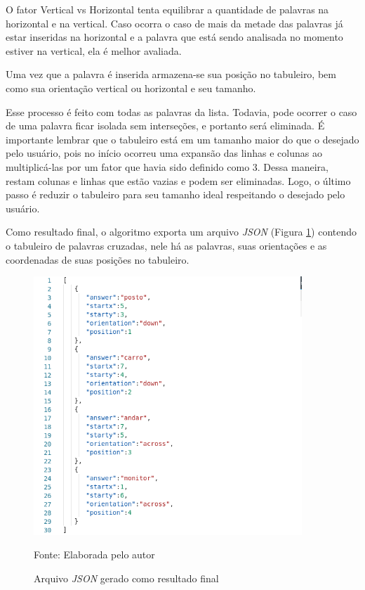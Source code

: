 O fator Vertical vs Horizontal tenta equilibrar a quantidade de palavras na horizontal e na vertical. Caso ocorra o caso de mais da metade das palavras já estar inseridas na horizontal e a palavra que está sendo analisada no momento estiver na vertical, ela é melhor avaliada.

Uma vez que a palavra é inserida armazena-se sua posição no tabuleiro, bem como sua orientação vertical ou horizontal e seu tamanho.

Esse processo é feito com todas as palavras da lista. Todavia, pode ocorrer o caso de uma palavra ficar isolada sem interseções, e portanto será eliminada. É importante lembrar que o tabuleiro está em um tamanho maior do que o desejado pelo usuário, pois no início ocorreu uma expansão das linhas e colunas ao multiplicá-las por um fator que havia sido definido como 3. Dessa maneira, restam colunas e linhas que estão vazias e podem ser eliminadas. Logo, o último passo é reduzir o tabuleiro para seu tamanho ideal respeitando o desejado pelo usuário. 

Como resultado final, o algoritmo exporta um arquivo \textit{JSON} (Figura \ref{fig:json}) contendo o tabuleiro de palavras cruzadas, nele há as palavras, suas orientações e as coordenadas de suas posições no tabuleiro.

\begin{figure}[H]
\centering
    \caption{Arquivo \textit{JSON} gerado como resultado final}
    \label{fig:json}
    \includegraphics[width=0.9\textwidth]{Figuras/codeJSONresult.png}
    
    Fonte: Elaborada pelo autor
\end{figure}

